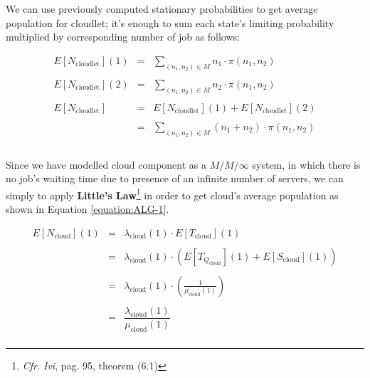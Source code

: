 \documentclass[10pt,a4paper]{article}
\begin{document}
We can use previously computed stationary probabilities to get average population for cloudlet; it's enough to sum each state's limiting probability multiplied by corresponding number of job as follows:

\begin{equation}
\label{eq:cloudletAveragePopulation}
\begin{array} {rcl} 
E[N_{\text{cloudlet}}](1) & = & \displaystyle \sum_{ (n_1, n_2) \in M} n_1 \cdot \pi(n_1,n_2) \\\\

E[N_{\text{cloudlet}}](2) & = & \displaystyle \sum_{ (n_1, n_2) \in M} n_2 \cdot \pi(n_1,n_2) \\\\

E[N_{\text{cloudlet}}] & = & E[N_{\text{cloudlet}}](1) + E[N_{\text{cloudlet}}](2) \\\\

& = & \displaystyle \sum_{ (n_1, n_2) \in M} (n_1 + n_2) \cdot \pi(n_1,n_2) \\\\

\end{array}
\end{equation}

Since we have modelled cloud component as a $M/M/\infty$ system, in which there is no job's waiting time due to presence of an infinite number of servers, we can simply to apply \textbf{Little’s Law}\footnote{\textit{Cfr.} \textit{Ivi}, pag. 95, theorem (6.1)} in order to get cloud's average population as shown in Equation \ref{equation:ALG-1}.

\begin{equation}
\label{eq:cloudAveragePopulation1}
\begin{array} {rcl} 
E[N_{\text{cloud}}](1) & = & \lambda_{\text{cloud}}(1) \cdot E[T_{\text{cloud}}](1)  \\\\

& = & \lambda_{\text{cloud}}(1) \cdot (E[T_{Q_{\text{cloud}}}](1) + E[S_{\text{cloud}}](1))  \\\\

& = & \lambda_{\text{cloud}}(1) \cdot (\frac{1}{\mu_{\text{cloud}}(1)}) \\\\

& = & \dfrac{\lambda_{\text{cloud}}(1)}{\mu_{\text{cloud}}(1)} \\

\end{array}
\end{equation}
\end{document}
